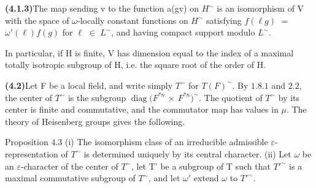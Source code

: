\documentclass[10pt,a4paper]{article}
\begin{document}
\par\noindent\textbf{(4.1.3)}\quad The map sending v to the function a(gv) on $H^\sim$ is an isomorphism of V with the space of $\omega{}$-locally constant functions on $H^\sim$ satisfying $f(\ell{}g)$ $=$ $\omega{}'(\ell{})f(g)$ for $\ell{}$ $\in{}$ $L^\sim$, and having compact support modulo $L^\sim$.\par
\par In particular, if H is finite, V has dimension equal to the index of a maximal totally isotropic subgroup of H, i.e. the square root of the order of H.\par
\par\noindent\textbf{(4.2)}\quad Let F be a local field, and write simply $T^\sim$ for $T(F)^\sim$. By $1.8.1$ and $2.2$, the center of $T^\sim$ is the subgroup $\operatorname{diag}(F^{*n}$ $\times{}$ $F^{*n})^\sim$. The quotient of $T^\sim$ by its center is finite and commutative, and the commutator map has values in $\mu{}$. The theory of Heisenberg groups gives the following.\par
\par Proposition $4.3$ (i) The isomorphism class of an irreducible admissible $\varepsilon{}$-representation of $T^\sim$ is determined uniquely by its central character. (ii) Let $\omega{}$ be an $\varepsilon{}$-character of the center of $T^\sim$, let T' be a subgroup of T such that $T'^\sim$ is a maximal commutative subgroup of $T^\sim$, and let $\omega{}'$ extend $\omega{}$ to $T'^\sim$.\par
\end{document}
